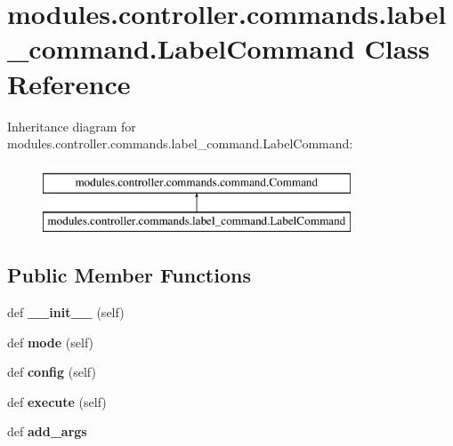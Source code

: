 \hypertarget{classmodules_1_1controller_1_1commands_1_1label__command_1_1_label_command}{}\section{modules.\+controller.\+commands.\+label\+\_\+command.\+Label\+Command Class Reference}
\label{classmodules_1_1controller_1_1commands_1_1label__command_1_1_label_command}
Inheritance diagram for modules.\+controller.\+commands.\+label\+\_\+command.\+Label\+Command\+:\begin{figure}[H]
\begin{center}
\leavevmode
\includegraphics[height=2.000000cm]{classmodules_1_1controller_1_1commands_1_1label__command_1_1_label_command}
\end{center}
\end{figure}
\subsection*{Public Member Functions}
\begin{DoxyCompactItemize}
\item 
\mbox{\label{classmodules_1_1controller_1_1commands_1_1label__command_1_1_label_command_ace24f8c42d67bc01da4f28eb10733c7f}} 
def {\bfseries \+\_\+\+\_\+init\+\_\+\+\_\+} (self)
\item 
\mbox{\label{classmodules_1_1controller_1_1commands_1_1label__command_1_1_label_command_a69a81d5739fcd1e4b188629b5beff8b1}} 
def {\bfseries mode} (self)
\item 
\mbox{\label{classmodules_1_1controller_1_1commands_1_1label__command_1_1_label_command_aae4e93651c3b4f8f743bd0d74a3a4995}} 
def {\bfseries config} (self)
\item 
\mbox{\label{classmodules_1_1controller_1_1commands_1_1label__command_1_1_label_command_a68feb24f94df88021e3830d96ea4bb44}} 
def {\bfseries execute} (self)
\item 
\mbox{\label{classmodules_1_1controller_1_1commands_1_1label__command_1_1_label_command_a355cdbfdcd1ca33bb0640789d4dba1b7}} 
def {\bfseries add\+\_\+args}
\end{DoxyCompactItemize}
